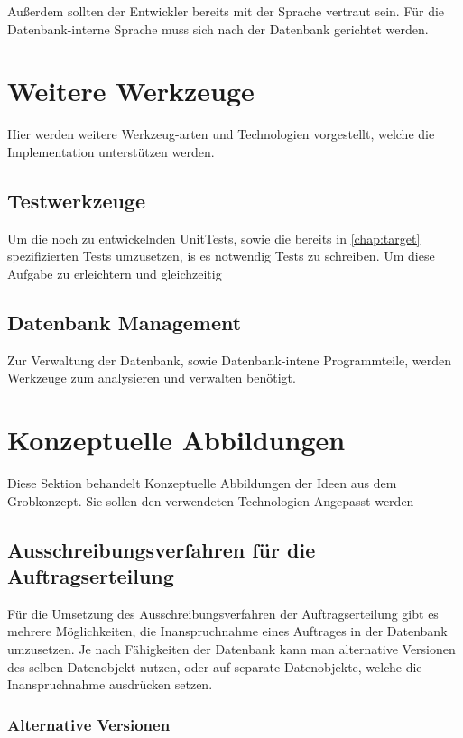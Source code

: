 Außerdem sollten der Entwickler bereits mit der Sprache vertraut sein.
Für die Datenbank-interne Sprache muss sich nach der Datenbank gerichtet werden.


\section{Weitere Werkzeuge}

Hier werden weitere Werkzeug-arten und Technologien vorgestellt,
welche die Implementation unterstützen werden.

\subsection{Testwerkzeuge}

Um die noch zu entwickelnden UnitTests,
sowie die bereits in \cref{chap:target} spezifizierten Tests umzusetzen,
is es notwendig Tests zu schreiben. Um diese Aufgabe zu erleichtern
und gleichzeitig 

\subsection{Datenbank Management}

Zur Verwaltung der Datenbank, sowie Datenbank-intene Programmteile,
werden Werkzeuge zum analysieren und verwalten benötigt.


\section{Konzeptuelle Abbildungen}

Diese Sektion behandelt Konzeptuelle Abbildungen der Ideen aus dem Grobkonzept.
Sie sollen den verwendeten Technologien Angepasst werden

\subsection{Ausschreibungsverfahren für die Auftragserteilung}
\label{sec:verfahren:erteilung}
Für die Umsetzung des Ausschreibungsverfahren der Auftragserteilung gibt es
mehrere Möglichkeiten, die Inanspruchnahme eines Auftrages in
der Datenbank umzusetzen. Je nach Fähigkeiten der Datenbank kann man 
alternative Versionen des selben Datenobjekt nutzen,
oder auf separate Datenobjekte, welche die Inanspruchnahme ausdrücken setzen.

\subsubsection{Alternative Versionen}

